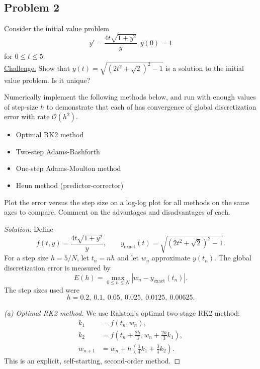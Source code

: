 \documentclass[12pt]{amsart}
\newenvironment{solution}
{\begin{proof}[Solution]}
{\end{proof}}
\begin{document}
\begin{onehalfspace}
        \section{Problem 2}
        Consider the initial value problem
        \[
            y' = \frac{4t\sqrt{1 + y^2}}{y}, y(0) = 1
        \]
        for $0\le t \le 5$.\\
        \underline{Challenge.} Show that $y(t)  = \sqrt{\left(2t^2 + \sqrt{2}\right)^2 - 1}$ is a solution to the
        initial value problem.
        Is it unique?

        Numerically implement the following methods below, and run with enough values of step-size $h$ to demonstrate
        that each of has convergence of global discretization error with rate $\mathcal{O}(h^2)$.
        \begin{itemize}
            \item[(a)] Optimal RK2 method
            \item[(b)] Two-step Adams-Bashforth
            \item[(c)] One-step Adams-Moulton method
            \item[(d)] Heun method (predictor-corrector)
        \end{itemize}
        Plot the error versus the step size on a log-log plot for all methods on the same axes to compare.
        Comment on the advantages and disadvantages of each.

        \begin{solution}
            Define
            \[
                f(t,y)=\frac{4t\sqrt{1+y^2}}{y},
                \qquad
                y_{\mathrm{exact}}(t)
                =\sqrt{\left(2t^2+\sqrt{2}\right)^2-1}.
            \]
            For a step size $h=5/N$, let $t_n=nh$ and let $w_n$
            approximate $y(t_n)$. The global discretization error is
            measured by
            \[
                E(h)=\max_{0\leq n\leq N}
                \left|w_n-y_{\mathrm{exact}}(t_n)\right|.
            \]
            The step sizes used were
            \[
                h=0.2,\ 0.1,\ 0.05,\ 0.025,\ 0.0125,\ 0.00625.
            \]

            \medskip
            \noindent
            \emph{(a) Optimal RK2 method.}
            We use Ralston's optimal two-stage RK2 method:
            \[
                \begin{aligned}
                    k_1&=f(t_n,w_n),\\
                    k_2&=f\left(t_n+\frac{2h}{3},
                    w_n+\frac{2h}{3}k_1\right),\\
                    w_{n+1}
                    &=w_n+h\left(\frac14 k_1+\frac34 k_2\right).
                \end{aligned}
            \]
            This is an explicit, self-starting, second-order method.


\end{solution}
\end{onehalfspace}
\end{document}
